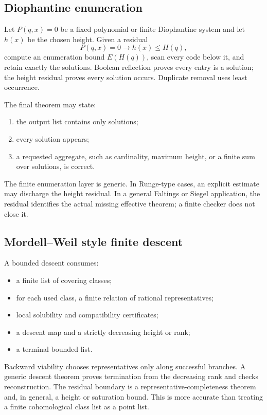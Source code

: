 \subsection{Diophantine enumeration}

Let \(P(q,x)=0\) be a fixed polynomial or finite Diophantine system and let \(h(x)\) be the chosen height.  Given a residual
\[
  P(q,x)=0\to h(x)\leq H(q),
\]
compute an enumeration bound \(E(H(q))\), scan every code below it, and retain exactly the solutions.  Boolean reflection proves every entry is a solution; the height residual proves every solution occurs.  Duplicate removal uses least occurrence.

The final theorem may state:
\begin{enumerate}[label=(\roman*),leftmargin=2.3em]
\item the output list contains only solutions;
\item every solution appears;
\item a requested aggregate, such as cardinality, maximum height, or a finite sum over solutions, is correct.
\end{enumerate}
The finite enumeration layer is generic.  In Runge-type cases, an explicit estimate may discharge the height residual.  In a general Faltings or Siegel application, the residual identifies the actual missing effective theorem; a finite checker does not close it.

\subsection{Mordell--Weil style finite descent}

A bounded descent consumes:
\begin{itemize}[leftmargin=2em]
\item a finite list of covering classes;
\item for each used class, a finite relation of rational representatives;
\item local solubility and compatibility certificates;
\item a descent map and a strictly decreasing height or rank;
\item a terminal bounded list.
\end{itemize}
Backward viability chooses representatives only along successful branches.  A generic descent theorem proves termination from the decreasing rank and checks reconstruction.  The residual boundary is a representative-completeness theorem and, in general, a height or saturation bound.  This is more accurate than treating a finite cohomological class list as a point list.

